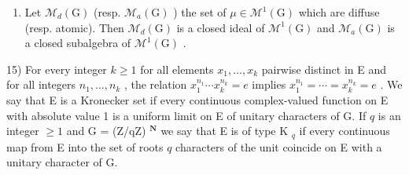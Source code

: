\begin{enumerate}
\def\labelenumi{\alph{enumi})}
\setcounter{enumi}{1}
\tightlist
\item
  Let \(\mathcal{M}_{d}(\mathrm{G})\) (resp. \(\mathcal{M}_{a}(\mathrm{G})\) ) the set of \(\mu\in\mathcal{M}^{1}(\mathrm{G})\) which are diffuse (resp. atomic). Then \(\mathcal{M}_{d}(\mathrm{G})\) is a closed ideal of \(\mathcal{M}^{1}(\mathrm{G})\) and \(\mathcal{M}_{a}(\mathrm{G})\) is a closed subalgebra of \(\mathcal{M}^{1}(\mathrm{G})\) .
\end{enumerate}

15) For every integer \(k \geqslant 1\) for all elements \(x_1, \ldots, x_k\) pairwise distinct in E and for all integers \(n_1, \ldots, n_k\) , the relation \(x_1^{n_1} \cdots x_k^{n_k} = e\) implies \(x_1^{n_1} = \cdots = x_k^{n_k} = e\) . We say that E is a Kronecker set if every continuous complex-valued function on E with absolute value 1 is a uniform limit on E of unitary characters of G. If \(q\) is an integer \(\geqslant 1\) and G = (Z/qZ) \(^{\mathbf{N}}\) we say that E is of type K \(_q\) if every continuous map from E into the set of roots \(q\) characters of the unit coincide on E with a unitary character of G.

